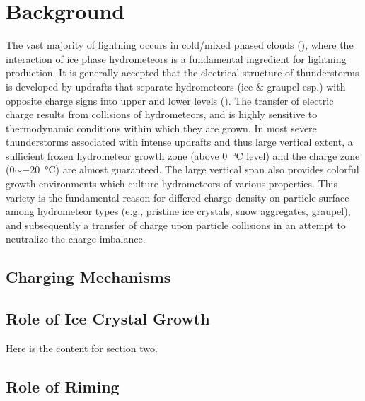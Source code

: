  
\chapter{Background}
\resetfootnote %

The vast majority of lightning occurs in cold/mixed phased clouds (\cite{wallace2006atmospheric}), where the interaction of ice phase hydrometeors is a fundamental ingredient for lightning production. It is generally accepted that the electrical structure of thunderstorms is developed by updrafts that separate hydrometeors (ice \& graupel esp.) with opposite charge signs into upper and lower levels (\cite{saunders2008charge}). The transfer of electric charge results from collisions of hydrometeors, and is highly sensitive to thermodynamic conditions within which they are grown. In most severe thunderstorms associated with intense updrafts and thus large vertical extent, a sufficient frozen hydrometeor growth zone (above \SI{0}{\celsius} level) and the charge zone (0$\sim$\SI{-20}{\celsius}) are almost guaranteed. The large vertical span also provides colorful growth environments which culture hydrometeors of various properties. This variety is the fundamental reason for differed charge density on particle surface among hydrometeor types (e.g., pristine ice crystals, snow aggregates, graupel), and subsequently a transfer of charge upon particle collisions in an attempt to neutralize the charge imbalance. 

\section{Charging Mechanisms}


\section{Role of Ice Crystal Growth}

Here is the content for section two.

\section{Role of Riming}

